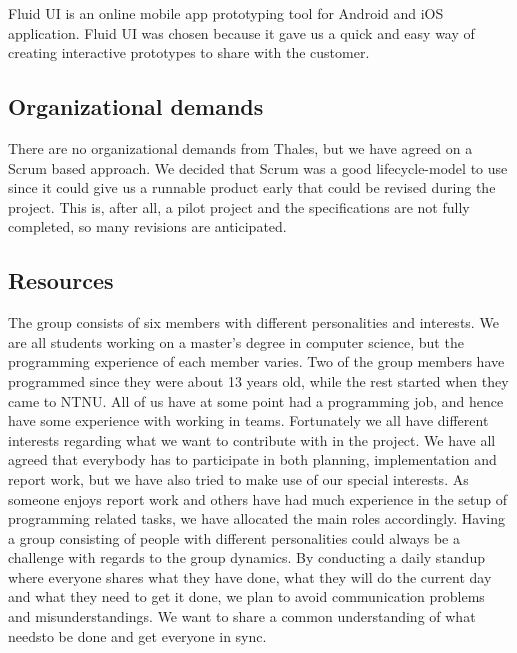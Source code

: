 Fluid UI \cite{bib:fui} is an online mobile app prototyping tool for Android and iOS application. Fluid UI was chosen because it gave us a quick and easy way of creating interactive prototypes to share with the customer.

\pagebreak

\subsection{Organizational demands}
There are no organizational demands from Thales, but we have agreed on a Scrum based approach. We decided that Scrum was a good lifecycle-model to use since it could give us a runnable product early that could be revised during the project. This is, after all, a pilot project and the specifications are not fully completed, so many revisions are anticipated.

\subsection{Resources}
The group consists of six members with different personalities and interests. We are all students working on a master's degree in computer science, but the programming experience of each member varies. Two of the group members have programmed since they were about 13 years old, while the rest started when they came to NTNU. All of us have at some point had a programming job, and hence have some experience with working in teams.
\newline
\newline
Fortunately we all have different interests regarding what we want to contribute with in the project. We have all agreed that everybody has to participate in both planning, implementation and report work, but we have also tried to make use of our special interests. As someone enjoys report work and others have had much experience in the setup of programming related tasks, we have allocated the main roles accordingly.
\newline
\newline
Having a group consisting of people with different personalities could always be a challenge with regards to the group dynamics. By conducting a daily standup where everyone shares what they have done, what they will do the current day and what they need to get it done, we plan to avoid communication problems and misunderstandings. We want to share a common understanding of what needsto be done and get everyone in sync. 

